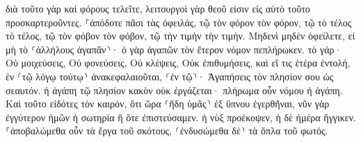 \documentclass{openreader}
\begin{document}
διὰ τοῦτο γὰρ καὶ φόρους τελεῖτε, λειτουργοὶ γὰρ θεοῦ εἰσιν εἰς αὐτὸ τοῦτο προσκαρτεροῦντες. 
⸀ἀπόδοτε πᾶσι τὰς ὀφειλάς, τῷ τὸν φόρον τὸν φόρον, τῷ τὸ τέλος τὸ τέλος, τῷ τὸν φόβον τὸν φόβον, τῷ τὴν τιμὴν τὴν τιμήν. 
Μηδενὶ μηδὲν ὀφείλετε, εἰ μὴ τὸ ⸂ἀλλήλους ἀγαπᾶν⸃· ὁ γὰρ ἀγαπῶν τὸν ἕτερον νόμον πεπλήρωκεν. 
τὸ γάρ· Οὐ μοιχεύσεις, Οὐ φονεύσεις, Οὐ κλέψεις, Οὐκ ἐπιθυμήσεις, καὶ εἴ τις ἑτέρα ἐντολή, ἐν ⸂τῷ λόγῳ τούτῳ⸃ ἀνακεφαλαιοῦται, ⸂ἐν τῷ⸃· Ἀγαπήσεις τὸν πλησίον σου ὡς σεαυτόν. 
ἡ ἀγάπη τῷ πλησίον κακὸν οὐκ ἐργάζεται· πλήρωμα οὖν νόμου ἡ ἀγάπη. 
Καὶ τοῦτο εἰδότες τὸν καιρόν, ὅτι ὥρα ⸂ἤδη ὑμᾶς⸃ ἐξ ὕπνου ἐγερθῆναι, νῦν γὰρ ἐγγύτερον ἡμῶν ἡ σωτηρία ἢ ὅτε ἐπιστεύσαμεν. 
ἡ νὺξ προέκοψεν, ἡ δὲ ἡμέρα ἤγγικεν. ⸀ἀποβαλώμεθα οὖν τὰ ἔργα τοῦ σκότους, ⸂ἐνδυσώμεθα δὲ⸃ τὰ ὅπλα τοῦ φωτός. 
\end{document}
